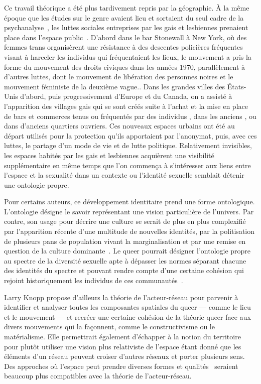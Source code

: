 Ce travail théorique a été plus tardivement repris par la géographie.
À la même époque que les études sur le genre avaient lieu et sortaient du seul cadre de la psychanalyse~\citep{Rubin2011a,Rubin2011}, les luttes sociales entreprises par les gais et lesbiennes prenaient place dans l'espace public~\citep[422-427]{Spencer2005}.
D'abord dans le bar Stonewall à New York, où des femmes trans organisèrent une résistance à des descentes policières fréquentes visant à harceler les individus \lgbt{} qui fréquentaient les lieux, le mouvement a pris la forme du mouvement des droits civiques dans les années 1970, parallèlement à d'autres luttes, dont le mouvement de libération des personnes noires  et le mouvement féministe de la deuxième vague..
Dans les grandes villes des États-Unis d'abord, puis progressivement d'Europe et du Canada, on a assisté à l'apparition des villages gais qui se sont créés suite à l'achat et la mise en place de bars et commerces tenus ou fréquentés par des individus \lgbt{}, dans les anciens , ou dans d'anciens quartiers ouvriers.
Ces nouveaux espaces urbains ont été au départ utilisés pour la protection qu'ils apportaient par l'anonymat, puis, avec ces luttes, le partage d'un mode de vie et de lutte politique.
Relativement invisibles, les espaces  habités par les gais et lesbiennes acquièrent une visibilité supplémentaire en même temps que l'on commença à s'intéresser aux liens entre l'espace et la sexualité dans un contexte ou l'identité sexuelle semblait détenir une ontologie propre.

Pour certains auteurs, ce développement identitaire prend une forme ontologique.
L'ontologie désigne le savoir représentant une vision particulière de l'univers.
Par contre, son usage pour décrire une culture se serait de plus en plus complexifié par l'apparition récente d'une multitude de nouvelles identités, par la politisation de plusieurs pans de population vivant la marginalisation et par une remise en question de la culture dominante~\citep[122]{Knopp2004}.
Le queer pourrait désigner l'ontologie propre au spectre de la diversité sexuelle apte à dépasser les normes séparant chacune des identités du spectre \lgbt{} et pouvant rendre compte d'une certaine cohésion qui rejoint historiquement les individus de ces communautés~\citep[122]{Knopp2004}.

Larry Knopp propose d'ailleurs la théorie de l'acteur-réseau pour parvenir à identifier et analyser toutes les composantes spatiales du queer --- comme le lieu et le mouvement --- et recréer une certaine cohésion de la théorie queer face aux divers mouvements qui la façonnent, comme le constructivisme ou le matérialisme.
Elle permettrait également d'échapper à la notion du territoire pour plutôt utiliser une vision plus relativiste de l'espace étant donné que les éléments d'un réseau peuvent croiser d'autres réseaux et porter plusieurs sens.
Des approches où l'espace peut prendre diverses formes et qualités~\citep{DiMeo1998} seraient beaucoup plus compatibles avec la théorie de l'acteur-réseau.

